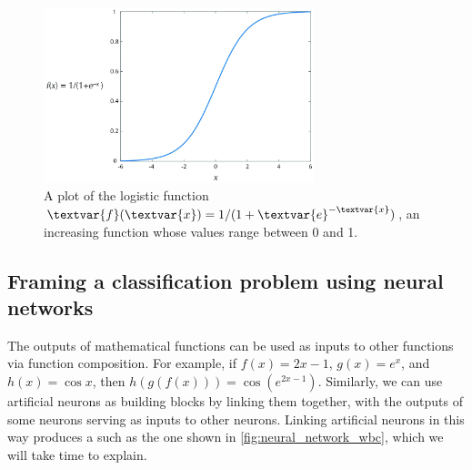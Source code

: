 \begin{figure}[h]
\centering
\mySfFamily
\includegraphics[width = 0.7\textwidth]{../images_CMYK/logistic_function}
\caption{A plot of the logistic function $\textvar{f}(\textvar{x}) = \text{1}/(\text{1}+\textvar{e}^{-\textvar{x}})$, an increasing function whose values range between 0 and 1.}
\label{fig:logistic_function}
\end{figure}

\begin{qbox}[%
Because of its simplicity, researchers now often use a ``rectifier'' activation function: $f(x) = \max(0, x)$. What does the graph of this function look like? What is the activation function used by a perceptron, and how does it differ from the rectifier function?
]\end{qbox}

\subsection{Framing a classification problem using neural networks}

The outputs of mathematical functions can be used as inputs to other functions via function composition. For example, if $f(x) = 2x-1$, $g(x) = e^x$, and $h(x) = \cos{x}$, then $h(g(f(x))) = \cos{(e^{2x-1})}$. Similarly, we can use artificial neurons as building blocks by linking them together, with the outputs of some neurons serving as inputs to other neurons. Linking artificial neurons in this way produces a  such as the one shown in \autoref{fig:neural_network_wbc}, which we will take time to explain.

